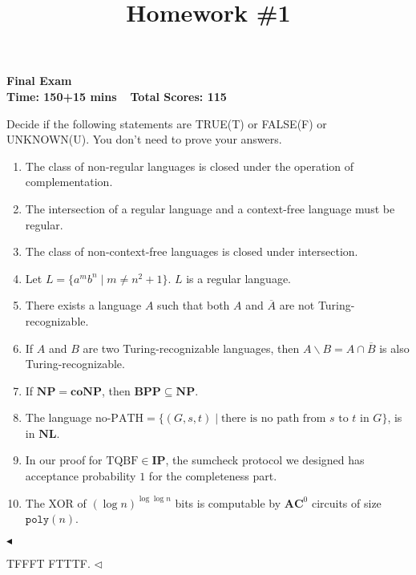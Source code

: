 \documentclass[11pt]{article}
\title{Homework \#1}
\newenvironment{problem}[2][Question]{\begin{trivlist}
\item[\hskip \labelsep{\bfseries#1}\hskip\labelsep{\bfseries#2.}]}{\hfill$\blacktriangleleft$\end{trivlist}}
\newenvironment{answer}[1][Solution]{\begin{trivlist}
\item[\hskip \labelsep{\bfseries#1.}\hskip \labelsep]}{\hfill$\lhd$\end{trivlist}}
\newcommand{\NP}{\mathbf{NP}}
\newcommand{\coNP}{\mathbf{coNP}}
\newcommand{\BPP}{\mathbf{BPP}}
\newcommand{\NL}{\mathbf{NL}}
\newcommand{\IP}{\mathbf{IP}}
\begin{document}
\kaishu

\pagestyle{fancy}
\chead{}

\begin{center}
    {\LARGE \bf Final Exam}\\
    {\bf Time: 150+15 mins $~~$ Total Scores: 115}            %
\end{center}

\begin{problem}{1.(20 points)}
    Decide if the following statements are TRUE(T) or FALSE(F) or UNKNOWN(U). You don't need to prove your answers.
    \begin{enumerate}[label=(\alph*)]
        \item The class of non-regular languages is closed under the operation of complementation.
        \item The intersection of a regular language and a context-free language must be regular.
        \item The class of non-context-free languages is closed under intersection.
        \item Let $L = \{a^m b^n \mid m \neq n^2 + 1\}$. $L$ is a regular language.
        \item There exists a language $A$ such that both $A$ and $\overline{A}$ are not Turing-recognizable.
        \item If $A$ and $B$ are two Turing-recognizable languages, then $A \backslash B = A \cap \overline{B}$ is also Turing-recognizable.
        \item If $\NP = \coNP$, then $\BPP \subseteq \NP$.
        \item The language $\text{no-PATH} = \{(G,s,t)\mid \text{there is no path from $s$ to $t$ in $G$}\}$, is in $\NL$.
        \item In our proof for $\text{TQBF} \in \IP$, the sumcheck protocol we designed has acceptance probability $1$ for the completeness part.
        \item The XOR of $(\log n)^{\log \log n}$ bits is computable by $\mathbf{AC}^0$ circuits of size $\texttt{poly}(n)$.
    \end{enumerate} 
\end{problem}
\begin{answer}
    TFFFT FTTTF.
\end{answer}
\newpage
\end{document}
